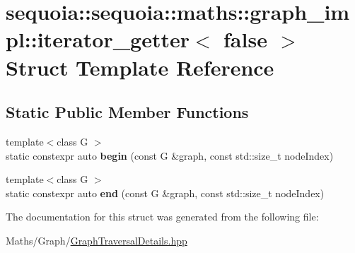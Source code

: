 \hypertarget{structsequoia_1_1sequoia_1_1maths_1_1graph__impl_1_1iterator__getter_3_01false_01_4}{}\section{sequoia\+::sequoia\+::maths\+::graph\+\_\+impl\+::iterator\+\_\+getter$<$ false $>$ Struct Template Reference}
\label{structsequoia_1_1sequoia_1_1maths_1_1graph__impl_1_1iterator__getter_3_01false_01_4}
\subsection*{Static Public Member Functions}
\begin{DoxyCompactItemize}
\item 
\mbox{\label{structsequoia_1_1sequoia_1_1maths_1_1graph__impl_1_1iterator__getter_3_01false_01_4_a487f9738fbd2b9c70712499f0cee07af}} 
{\footnotesize template$<$class G $>$ }\\static constexpr auto {\bfseries begin} (const G \&graph, const std\+::size\+\_\+t node\+Index)
\item 
\mbox{\label{structsequoia_1_1sequoia_1_1maths_1_1graph__impl_1_1iterator__getter_3_01false_01_4_addedbd4e0b91f2c7c0fe9a631facc2aa}} 
{\footnotesize template$<$class G $>$ }\\static constexpr auto {\bfseries end} (const G \&graph, const std\+::size\+\_\+t node\+Index)
\end{DoxyCompactItemize}


The documentation for this struct was generated from the following file\+:\begin{DoxyCompactItemize}
\item 
Maths/\+Graph/\mbox{\hyperlink{_graph_traversal_details_8hpp}{Graph\+Traversal\+Details.\+hpp}}\end{DoxyCompactItemize}
